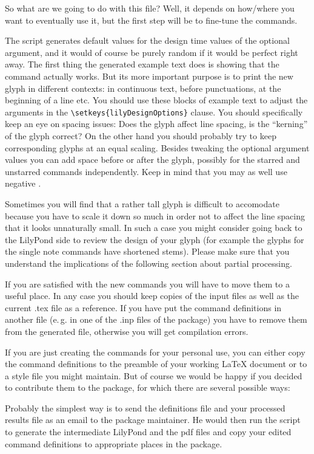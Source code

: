 \documentclass{article}
\begin{document}
So what are we going to do with this file?
Well, it depends on how/where you want to eventually use it, but the first step will be to fine-tune the commands.

The script generates default values for the design time values of the optional argument, and it would of course be purely random if it would be perfect right away.
The first thing the generated example text does is showing that the command actually works.
But its more important purpose is to print the new glyph in different contexts: in continuous text, before punctuations, at the beginning of a line etc.
You should use these blocks of example text to adjust the arguments in the \verb|\setkeys{lilyDesignOptions}| clause.
You should specifically keep an eye on spacing issues: Does the glyph affect line spacing, is the “kerning” of the glyph correct?
On the other hand you should probably try to keep corresponding glyphs at an equal scaling.
Besides tweaking the optional argument values you can add space before or after the glyph, possibly for the starred and unstarred commands independently.
Keep in mind that you may as well use negative .

Sometimes you will find that a rather tall glyph is difficult to accomodate because you have to scale it down so much in order not to affect the line spacing that it looks unnaturally small.
In such a case you might consider going back to the LilyPond side to review the design of your glyph (for example the glyphs for the single note commands have shortened stems).
Please make sure that you understand the implications of the following section about partial processing.

\medskip
If you are satisfied with the new commands you will have to move them to a useful place.
In any case you should keep copies of the input files as well as the current .tex file as a reference.
If you have put the command definitions in another file (e.\,g. in one of the .inp files of the \lilyglyphs{} package) you have to remove them from the generated file, otherwise you will get compilation errors.

If you are just creating the commands for your personal use, you can either copy the command definitions to the preamble of your working \LaTeX{} document or to a style file you might maintain.
But of course we would be happy if you decided to contribute them to the package, for which there are several possible ways:

Probably the simplest way is to send the definitions file and your processed results file as an email to the package maintainer. He would then run the script to generate the intermediate LilyPond and the pdf files and copy your edited command definitions to appropriate places in the package.
\end{document}

